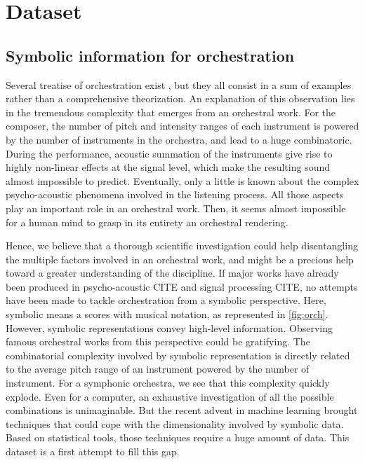 \documentclass[twoside,twocolumn]{article}
\begin{document}
\section{Dataset}
\subsection{Symbolic information for orchestration}
Several treatise of orchestration exist \cite{koechli_orch,piston-orch,Rimsky-Korsakov:1873aa}, but they all consist in a sum of examples rather than a comprehensive theorization.
An explanation of this observation lies in the tremendous complexity that emerges from an orchestral work. For the composer, the number of pitch and intensity ranges of each instrument is powered by the number of instruments in the orchestra, and lead to a huge combinatoric. During the performance, acoustic summation of the instruments give rise to highly non-linear effects at the signal level, which make the resulting sound almost impossible to predict. Eventually, only a little is known about the complex psycho-acoustic phenomena involved in the listening process. All those aspects play an important role in an orchestral work. Then, it seems almost impossible for a human mind to grasp in its entirety an orchestral rendering.

Hence, we believe that a thorough scientific investigation could help disentangling the multiple factors involved in an orchestral work, and might be a precious help toward a greater understanding of the discipline.
If major works have already been produced in psycho-acoustic CITE and signal processing CITE, no attempts have been made to tackle orchestration from a symbolic perspective.
Here, symbolic means a scores with musical notation, as represented in \ref{fig:orch}.
However, symbolic representations convey high-level information. Observing famous orchestral works from this perspective could be gratifying.
The combinatorial complexity involved by symbolic representation is directly related to the average pitch range of an instrument powered by the number of instrument. For a symphonic orchestra, we see that this complexity quickly explode. Even for a computer, an exhaustive investigation of all the possible combinations is unimaginable.
But the recent advent in machine learning brought techniques that could cope with the dimensionality involved by symbolic data.
Based on statistical tools, those techniques require a huge amount of data. This dataset is a first attempt to fill this gap.
\end{document}
